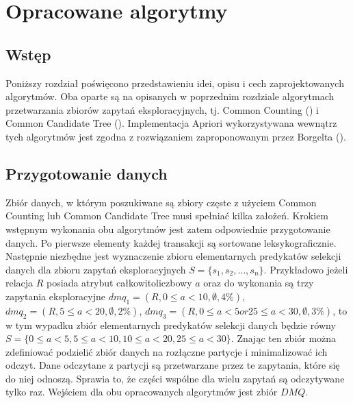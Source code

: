 \chapter{Opracowane algorytmy}
\label{c4}

\section{Wstęp}
\label{c41}
Poniższy rozdział poświęcono przedstawieniu idei, opisu i cech zaprojektowanych algorytmów. Oba oparte są na opisanych w poprzednim rozdziale algorytmach przetwarzania zbiorów zapytań eksploracyjnych, tj. Common Counting (\cite{WojciechowskiCC}) i Common Candidate Tree (\cite{WojciechowskiCCT}). Implementacja Apriori wykorzystywana wewnątrz tych algorytmów jest zgodna z rozwiązaniem zaproponowanym przez Borgelta (\cite{Borgelt}). 

\section{Przygotowanie danych}
\label{c42}
Zbiór danych, w którym poszukiwane są zbiory częste z użyciem Common Counting lub Common Candidate Tree musi spełniać kilka założeń. Krokiem wstępnym wykonania obu algorytmów jest zatem odpowiednie przygotowanie danych. Po pierwsze elementy każdej transakcji są sortowane leksykograficznie. Następnie niezbędne jest wyznaczenie zbioru elementarnych predykatów selekcji danych dla zbioru zapytań eksploracyjnych \(S = \{s_1, s_2, \dots, s_n\}\). Przykładowo jeżeli relacja \(R\) posiada atrybut całkowitoliczbowy \(a\) oraz do wykonania są trzy zapytania eksploracyjne \(dmq_1=(R, 0 \leq a < 10, \emptyset, 4\%)\), \(dmq_2=(R, 5\leq a < 20, \emptyset, 2\%)\), \(dmq_3=(R, 0\leq a < 5 or 25\leq a < 30, \emptyset, 3\%)\), to w tym wypadku zbiór elementarnych predykatów selekcji danych będzie równy  \(S = \{0\leq a < 5, 5\leq a < 10, 10\leq a < 20, 25\leq a < 30\}\). Znając ten zbiór można zdefiniować podzielić zbiór danych na rozłączne partycje i minimalizować ich odczyt. Dane odczytane z partycji są przetwarzane przez te zapytania, które się do niej odnoszą. Sprawia to, że części wspólne dla wielu zapytań są odczytywane tylko raz. Wejściem dla obu opracowanych algorytmów jest zbiór \(DMQ\).

